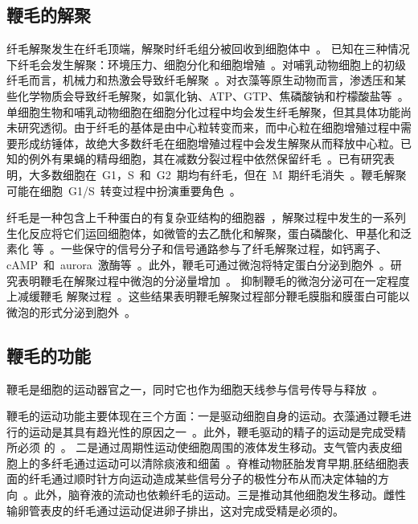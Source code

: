\subsection{鞭毛的解聚}
纤毛解聚发生在纤毛顶端，解聚时纤毛组分被回收到细胞体中\ \citep{Liang2016,Pan2005,Marshall2001}。 已知在三种情况下纤毛会发生解聚：环境压力、细胞分化和细胞增殖\ \citep{Liang2016}。对哺乳动物细胞上的初级纤毛而言，机械力和热激会导致纤毛解聚\ \citep{Liang2016}。对衣藻等原生动物而言，渗透压和某些化学物质会导致纤毛解聚，如氯化钠、ATP、GTP、焦磷酸钠和柠檬酸盐等\ \citep{Liang2016}。单细胞生物和哺乳动物细胞在细胞分化过程中均会发生纤毛解聚，但其具体功能尚未研究透彻。由于纤毛的基体是由中心粒转变而来，而中心粒在细胞增殖过程中需要形成纺锤体，故绝大多数纤毛在细胞增殖过程中会发生解聚从而释放中心粒。已知的例外有果蝇的精母细胞，其在减数分裂过程中依然保留纤毛\ \citep{Riparbelli2012}。已有研究表明，大多数细胞在\ G1，S\ 和\ G2\ 期均有纤毛，但在\ M\ 期纤毛消失\ \citep{Liang2016}。鞭毛解聚可能在细胞\ G1/S\ 转变过程中扮演重要角色\ \citep{Liang2016}。

纤毛是一种包含上千种蛋白的有复杂亚结构的细胞器\ \citep{Rohatgi2010}，解聚过程中发生的一系列生化反应将它们运回细胞体，如微管的去乙酰化和解聚，蛋白磷酸化、甲基化和泛素化
等\ \citep{Liang2016,Meng2016a,Hu2015,Huang2009,Long2015}。一些保守的信号分子和信号通路参与了纤毛解聚过程，如钙离子、cAMP\ 和\ aurora\ 激酶等\ \citep{Liang2016,Hu2015,Meng2016a,Hu2015a}。此外，鞭毛可通过微泡将特定蛋白分泌到胞外\ \citep{Wood2015,Wang2016,Long2016}。研究表明鞭毛在解聚过程中微泡的分泌量增加\ \citep{Long2016}。 抑制鞭毛的微泡分泌可在一定程度上减缓鞭毛
解聚过程\ \citep{Long2016}。这些结果表明鞭毛解聚过程部分鞭毛膜脂和膜蛋白可能以微泡的形式分泌到胞外\ \citep{Long2016}。

\subsection{鞭毛的功能}
鞭毛是细胞的运动器官之一，同时它也作为细胞天线参与信号传导与释放\
\citep{Marshall2006,Singla2006}。

鞭毛的运动功能主要体现在三个方面：一是驱动细胞自身的运动。衣藻通过鞭毛进行的运动是其具有趋光性的原因之一\ \citep{Okita2005,Wakabayashi2011}。此外，鞭毛驱动的精子的运动是完成受精所必须
的\ \citep{Turner2003}。 二是通过周期性运动使细胞周围的液体发生移动。支气管内表皮细胞上的多纤毛通过运动可以清除痰液和细菌\
\citep{Marshall2006}。脊椎动物胚胎发育早期,胚结细胞表面的纤毛通过顺时针方向运动造成某些信号分子的极性分布从而决定体轴的方向\ \citep{Hirokawa2006}。此外，脑脊液的流动也依赖纤毛的运动。三是推动其他细胞发生移动。雌性输卵管表皮的纤毛通过运动促进卵子排出，这对完成受精是必须的。

